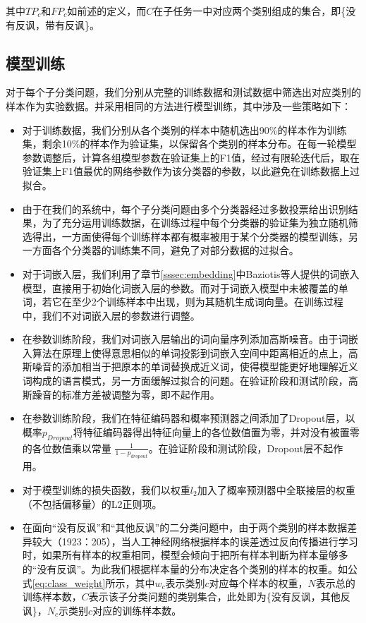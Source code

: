 其中$TP_c$和$FP_c$如前述的定义，而$C$在子任务一中对应两个类别组成的集合，即\{没有反讽，带有反讽\}。

\subsection{模型训练}
\label{ssec:exp_irony_det_model_training}

对于每个子分类问题，我们分别从完整的训练数据和测试数据中筛选出对应类别的样本作为实验数据。并采用相同的方法进行模型训练，其中涉及一些策略如下：

\begin{itemize}

\item 对于训练数据，我们分别从各个类别的样本中随机选出90\%的样本作为训练集，剩余10\%的样本作为验证集，以保留各个类别的样本分布。在每一轮模型参数调整后，计算各组模型参数在验证集上的F1值，经过有限轮迭代后，取在验证集上F1值最优的网络参数作为该分类器的参数，以此避免在训练数据上过拟合。

\item 由于在我们的系统中，每个子分类问题由多个分类器经过多数投票给出识别结果，为了充分运用训练数据，在训练过程中每个分类器的验证集为独立随机筛选得出，一方面使得每个训练样本都有概率被用于某个分类器的模型训练，另一方面各个分类器的训练集不同，避免了对部分数据的过拟合。

\item 对于词嵌入层，我们利用了章节\ref{sssec:embedding}中Baziotis等人\cite{baziotis2018ntua}提供的词嵌入模型，直接用于初始化词嵌入层的参数。而对于词嵌入模型中未被覆盖的单词，若它在至少2个训练样本中出现，则为其随机生成词向量。在训练过程中，我们不对词嵌入层的参数进行调整。

\item 在参数训练阶段，我们对词嵌入层输出的词向量序列添加高斯噪音。由于词嵌入算法在原理上使得意思相似的单词投影到词嵌入空间中距离相近的点上，高斯噪音的添加相当于把原本的单词替换成近义词，使得模型能更好地理解近义词构成的语言模式，另一方面缓解过拟合的问题。在验证阶段和测试阶段，高斯躁音的标准方差被调整为零，即不起作用。

\item 在参数训练阶段，我们在特征编码器和概率预测器之间添加了Dropout层，以概率$p_{Dropout}$将特征编码器得出特征向量上的各位数值置为零，并对没有被置零的各位数值乘以常量 $\frac{1}{1-p_{dropout}}$。在验证阶段和测试阶段，Dropout层不起作用。

\item 对于模型训练的损失函数，我们以权重$l_2$加入了概率预测器中全联接层的权重（不包括偏移量）的L2正则项。

\item 在面向“没有反讽”和“其他反讽”的二分类问题中，由于两个类别的样本数据差异较大（1923：205），当人工神经网络根据样本的误差透过反向传播进行学习时，如果所有样本的权重相同，模型会倾向于把所有样本判断为样本量够多的“没有反讽”。为此我们根据样本量的分布决定各个类别的样本的权重。如公式\ref{eq:class_weight}所示，其中$w_c$表示类别$c$对应每个样本的权重，$N$表示总的训练样本数，$C$表示该子分类问题的类别集合，此处即为\{没有反讽，其他反讽\}，$N_c$示类别$c$对应的训练样本数。

\end{itemize}

